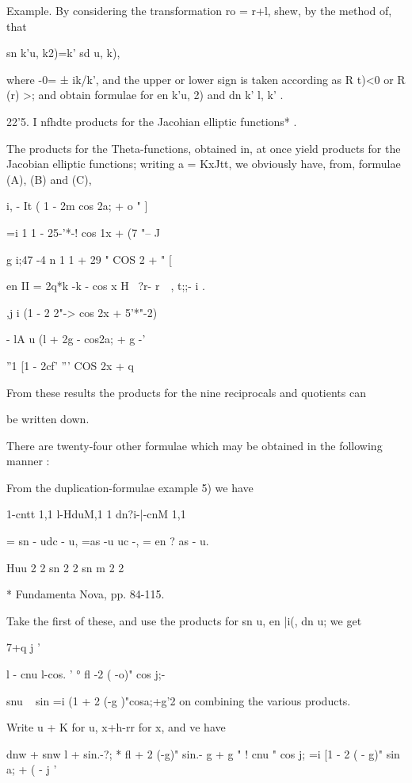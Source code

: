 Example. By considering the transformation ro = r+l, shew, by the
method of, that

sn k'u, k2)=k' sd u, k),

where -0= ± ik/k', and the upper or lower sign is taken according as R
t)<0 or R (r) >; and obtain formulae for en k'u, 2) and dn k' l, k' .

22'5. I nfhdte products for the Jacohian elliptic functions* .

The products for the Theta-functions, obtained in, at once
yield products for the Jacobian elliptic functions; writing a =
KxJtt, we obviously have, from, formulae (A), (B) and (C),

  i, - It  ( 1 - 2m cos 2a; + o " ]

   =i 1 1 - 25-'*-! cos 1x + (7 "-- J

g i;47 -4 n 1 1 + 29 " COS 2 + " [

en II = 2q*k -k - cos x H \ ?r- r~~, t;;- i .

,j i (1 - 2 2"-> cos 2x + 5'*"-2)

- lA u (l + 2g - cos2a; + g -'

''1 [1 - 2cf' ''' COS 2x + q

From these results the products for the nine reciprocals and quotients
can

be written down.

There are twenty-four other formulae which may be obtained in the
following manner :

From the duplication-formulae  example 5) we have

1-cntt 1,1 l-HduM,1 1 dn?i-|-cnM 1,1

= sn - udc - u, =as -u uc -,  = en ? as - u.

Huu 2 2 sn 2 2 sn m 2 2

* Fundamenta Nova, pp. 84-115.

%
%

Take the first of these, and use the products for sn u, en |i(, dn u;
we get

7+q j '

l - cnu l-cos. ' ° fl -2 ( -o)" cos j;-

snu ~ sin =i (1 + 2 (-g )"cosa;+g'2 on combining the various products.

Write u + K for u, x+h-rr for x, and ve have

dnw + snw l + sin.-?; * fl + 2 (-g)" sin.- g + g " ! cnu " cos j; =i
[1 - 2 ( - g)" sin a; + ( - j '

